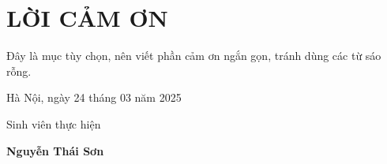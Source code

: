 \section*{LỜI CẢM ƠN}
    \thispagestyle{empty}
Đây là mục tùy chọn, nên viết phần cảm ơn ngắn gọn, tránh dùng các từ sáo rỗng.

\vspace{6pt}
    \hspace{7cm}Hà Nội, ngày 24 tháng 03 năm 2025
        
        \hspace{8.6cm} Sinh viên thực hiện      %

\vspace{2cm}
    \hspace{8.8cm}\textbf{Nguyễn Thái Sơn} %